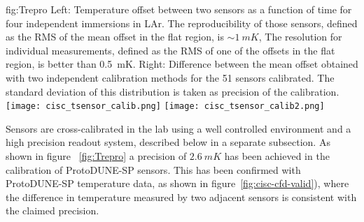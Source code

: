 \begin{dunefigure}{fig:Trepro}{
 Left:   Temperature offset between two sensors as a function of time for four independent immersions in LAr. The reproducibility of those sensors, defined as the RMS of the mean offset in the flat region, is $\sim \SI{1}{mK}$,
    The resolution for individual measurements, defined as the RMS of one of the offsets in the flat region, is better than \SI{0.5}{mK}. Right: Difference between the mean offset obtained with two independent calibration methods for the 51 sensors calibrated. The standard deviation of this distribution is taken as precision of the calibration.}
  \texttt{[image: cisc\_tsensor\_calib.png]}%
  \texttt{[image: cisc\_tsensor\_calib2.png]}%
\end{dunefigure}

Sensors are cross-calibrated in the lab using a well controlled environment and a high precision readout system, described below in a separate subsection.
As shown in figure ~\ref{fig:Trepro} a precision of $\SI{2.6}{mK}$ has been achieved in the calibration of ProtoDUNE-SP sensors. This has been confirmed with ProtoDUNE-SP temperature data, as shown in figure~\ref{fig:cisc-cfd-valid}), where the difference in temperature measured by two adjacent sensors is consistent with the claimed precision.  


